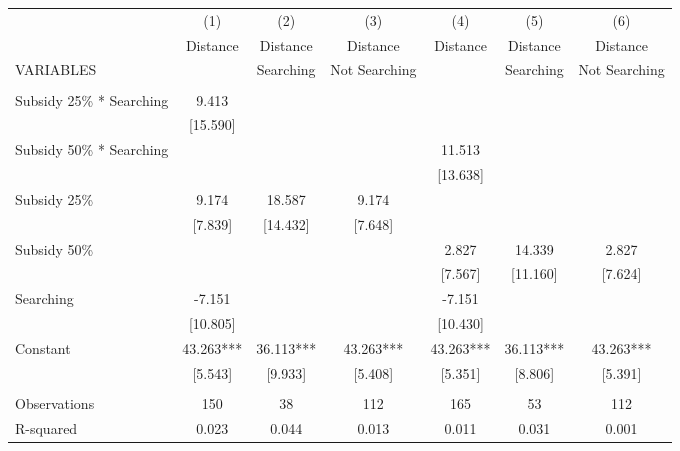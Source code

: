 \begin{tabular}{lcccccc} \hline
 & (1) & (2) & (3) & (4) & (5) & (6) \\
 & Distance & Distance & Distance & Distance & Distance & Distance \\
VARIABLES &  & Searching & Not Searching &  & Searching & Not Searching \\ \hline
 &  &  &  &  &  &  \\
Subsidy 25\% * Searching & 9.413 &  &  &  &  &  \\
 & [15.590] &  &  &  &  &  \\
Subsidy 50\% * Searching &  &  &  & 11.513 &  &  \\
 &  &  &  & [13.638] &  &  \\
Subsidy 25\% & 9.174 & 18.587 & 9.174 &  &  &  \\
 & [7.839] & [14.432] & [7.648] &  &  &  \\
Subsidy 50\% &  &  &  & 2.827 & 14.339 & 2.827 \\
 &  &  &  & [7.567] & [11.160] & [7.624] \\
Searching & -7.151 &  &  & -7.151 &  &  \\
 & [10.805] &  &  & [10.430] &  &  \\
Constant & 43.263*** & 36.113*** & 43.263*** & 43.263*** & 36.113*** & 43.263*** \\
 & [5.543] & [9.933] & [5.408] & [5.351] & [8.806] & [5.391] \\
 &  &  &  &  &  &  \\
Observations & 150 & 38 & 112 & 165 & 53 & 112 \\
 R-squared & 0.023 & 0.044 & 0.013 & 0.011 & 0.031 & 0.001 \\ \hline
\end{tabular}
